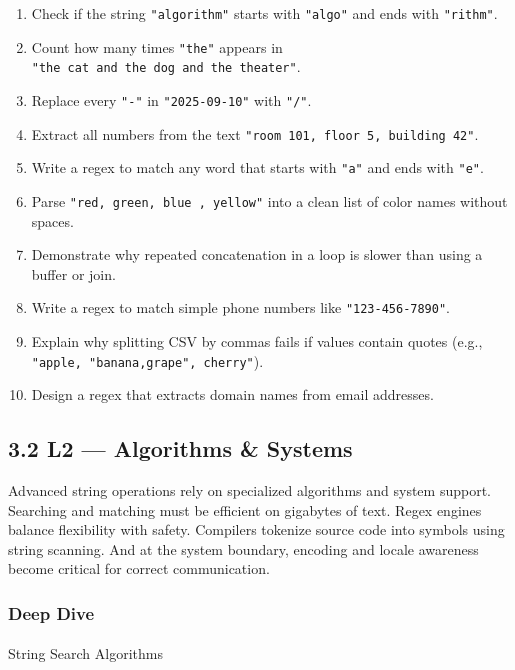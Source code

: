 \documentclass[
  letterpaper,
  DIV=11,
  numbers=noendperiod]{scrreprt}
\makeatletter
\let\oldparagraph\paragraph
\renewcommand{\paragraph}{
    \@ifstar
      \xxxParagraphStar
      \xxxParagraphNoStar
  }
\newcommand{\xxxParagraphStar}[1]{\oldparagraph*{#1}\mbox{}}
\newcommand{\xxxParagraphNoStar}[1]{\oldparagraph{#1}\mbox{}}
\providecommand{\tightlist}{%
  \setlength{\itemsep}{0pt}\setlength{\parskip}{0pt}}
\makeatother
\begin{document}
\begin{enumerate}
\def\labelenumi{\arabic{enumi}.}
\tightlist
\item
  Check if the string \texttt{"algorithm"} starts with \texttt{"algo"}
  and ends with \texttt{"rithm"}.
\item
  Count how many times \texttt{"the"} appears in
  \texttt{"the\ cat\ and\ the\ dog\ and\ the\ theater"}.
\item
  Replace every \texttt{"-"} in \texttt{"2025-09-10"} with \texttt{"/"}.
\item
  Extract all numbers from the text
  \texttt{"room\ 101,\ floor\ 5,\ building\ 42"}.
\item
  Write a regex to match any word that starts with \texttt{"a"} and ends
  with \texttt{"e"}.
\item
  Parse \texttt{"red,\ green,\ blue\ ,\ yellow"} into a clean list of
  color names without spaces.
\item
  Demonstrate why repeated concatenation in a loop is slower than using
  a buffer or join.
\item
  Write a regex to match simple phone numbers like
  \texttt{"123-456-7890"}.
\item
  Explain why splitting CSV by commas fails if values contain quotes
  (e.g., \texttt{"apple,\ "banana,grape",\ cherry"}).
\item
  Design a regex that extracts domain names from email addresses.
\end{enumerate}

\subsection{3.2 L2 --- Algorithms \&
Systems}\label{l2-algorithms-systems}

Advanced string operations rely on specialized algorithms and system
support. Searching and matching must be efficient on gigabytes of text.
Regex engines balance flexibility with safety. Compilers tokenize source
code into symbols using string scanning. And at the system boundary,
encoding and locale awareness become critical for correct communication.

\subsubsection{Deep Dive}\label{deep-dive-27}

\paragraph{String Search Algorithms}\label{string-search-algorithms}
\end{document}

